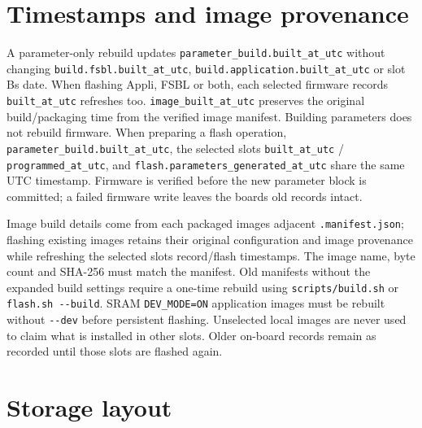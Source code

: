 \documentclass[10pt,a4paper,oneside]{report}
\begin{document}
\section{Timestamps and image provenance}\label{wiki-firmware-parameters--timestamps-and-image-provenance}

A parameter-only rebuild updates \texttt{parameter\_\allowbreak{}build.\allowbreak{}built\_\allowbreak{}at\_\allowbreak{}utc} without changing \texttt{build.\allowbreak{}fsbl.\allowbreak{}built\_\allowbreak{}at\_\allowbreak{}utc}, \texttt{build.\allowbreak{}application.\allowbreak{}built\_\allowbreak{}at\_\allowbreak{}utc} or slot B\textquotesingle s date. When flashing Appli, FSBL or both, each selected firmware record\textquotesingle s \texttt{built\_\allowbreak{}at\_\allowbreak{}utc} refreshes too. \texttt{image\_\allowbreak{}built\_\allowbreak{}at\_\allowbreak{}utc} preserves the original build/packaging time from the verified image manifest. Building parameters does not rebuild firmware. When preparing a flash operation, \texttt{parameter\_\allowbreak{}build.\allowbreak{}built\_\allowbreak{}at\_\allowbreak{}utc}, the selected slots\textquotesingle{} \texttt{built\_\allowbreak{}at\_\allowbreak{}utc} / \texttt{programmed\_\allowbreak{}at\_\allowbreak{}utc}, and \texttt{flash.\allowbreak{}parameters\_\allowbreak{}generated\_\allowbreak{}at\_\allowbreak{}utc} share the same UTC timestamp. Firmware is verified before the new parameter block is committed; a failed firmware write leaves the board\textquotesingle s old records intact.

Image build details come from each packaged image\textquotesingle s adjacent \texttt{.\allowbreak{}manifest.\allowbreak{}json}; flashing existing images retains their original configuration and image provenance while refreshing the selected slots\textquotesingle{} record/flash timestamps. The image name, byte count and SHA-256 must match the manifest. Old manifests without the expanded build settings require a one-time rebuild using \texttt{scripts/\allowbreak{}build.\allowbreak{}sh} or \texttt{flash.\allowbreak{}sh -\allowbreak{}-\allowbreak{}build}. SRAM \texttt{DEV\_\allowbreak{}MODE=ON} application images must be rebuilt without \texttt{-\allowbreak{}-\allowbreak{}dev} before persistent flashing. Unselected local images are never used to claim what is installed in other slots. Older on-board records remain as recorded until those slots are flashed again.

\section{Storage layout}\label{wiki-firmware-parameters--storage-layout}
\end{document}
